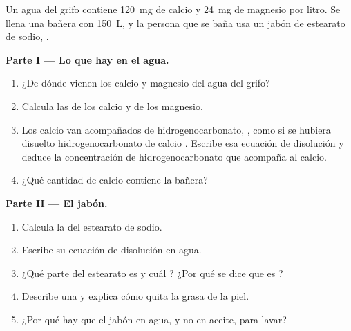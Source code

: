 \begin{problem}
\label{pb:g11:dissolution:1}
Un agua del grifo contiene \qty{120}{mg} de  calcio y \qty{24}{mg}
de  magnesio por litro. Se llena una bañera con \qty{150}{L}, y la
persona que se baña usa un jabón de estearato de sodio,
.

\medskip
\noindent\textbf{Parte I --- Lo que hay en el agua.}
\begin{enumerate}
  \item ¿De dónde vienen los  calcio y magnesio del agua del
        grifo?
  \item Calcula las  de los  calcio y de los
         magnesio.
  \item Los  calcio van acompañados de  hidrogenocarbonato,
        , como si se hubiera disuelto hidrogenocarbonato de
        calcio . Escribe esa ecuación de disolución y
        deduce la concentración de  hidrogenocarbonato que acompaña
        al calcio.
  \item ¿Qué cantidad de  calcio contiene la bañera?
\end{enumerate}

\medskip
\noindent\textbf{Parte II --- El jabón.}
\begin{enumerate}[resume]
  \item Calcula la  del estearato de sodio.
  \item Escribe su ecuación de disolución en agua.
  \item ¿Qué parte del  estearato es  y cuál ?
        ¿Por qué se dice que es ?
  \item Describe una  y explica cómo quita la grasa de la piel.
  \item ¿Por qué hay que  el jabón en agua, y no en aceite, para
        lavar?
\end{enumerate}


\end{problem}
